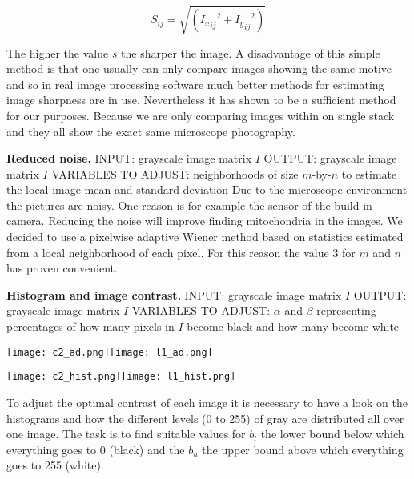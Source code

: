 \documentclass[a4paper, 11pt]{article}
\begin{document}
\begin{equation}
	S_{ij}=\sqrt{({{I_x}_{ij}}^2+{{I_y}_{ij}}^2)}
\end{equation}


The higher the value $s$ the sharper the image. A disadvantage of this simple method is that one usually  can only compare images showing the same motive and so in real image processing software much better methods for estimating image sharpness are in use. Nevertheless it has shown to be a sufficient method for our purposes. Because we are only comparing images within on single stack and they all show the exact same microscope photography.
\newline
\newline

\textbf{Reduced noise.} 
\newline
\newline
INPUT: grayscale image matrix $I$
\newline
OUTPUT: grayscale image matrix $I$
\newline
VARIABLES TO ADJUST: neighborhoods of size $m$-by-$n$ to estimate the local image mean and standard deviation
\newline
\newline
Due to the microscope environment the pictures are noisy. One reason is for example the sensor of the build-in camera. Reducing the noise will improve finding mitochondria in the images. We decided to use a pixelwise adaptive Wiener method based on statistics estimated from a local neighborhood of each pixel. For this reason the value 3 for $m$ and $n$ has proven convenient.
\newline
\newline

\textbf{Histogram and image contrast.} 
\newline
\newline
INPUT: grayscale image matrix $I$
\newline
OUTPUT: grayscale image matrix $I$
\newline
VARIABLES TO ADJUST: $\alpha$ and $\beta$ representing percentages of how many pixels in $I$ become black and how many become white
\newline
\newline
\begin{center}\texttt{[image: c2\_ad.png]}\texttt{[image: l1\_ad.png]}
\end{center}
\begin{center}\texttt{[image: c2\_hist.png]}\texttt{[image: l1\_hist.png]}
\end{center}
To adjust the optimal contrast of each image it is necessary to have a look on the histograms and how the different levels (0 to 255) of gray are distributed all over one image. The task is to find suitable values for $b_{l}$ the lower bound below which everything goes to 0 (black) and the $b_u$ the upper bound above which everything goes to 255 (white). 
\end{document}
